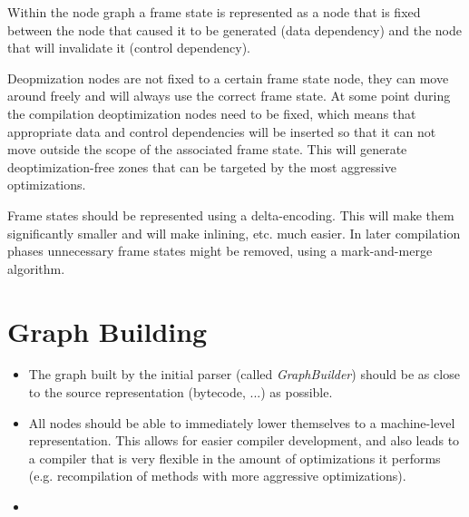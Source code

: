 Within the node graph a frame state is represented as a node that is fixed between the node that caused it to be generated (data dependency) and the node that will invalidate it (control dependency).

Deopmization nodes are not fixed to a certain frame state node, they can move around freely and will always use the correct frame state.
At some point during the compilation deoptimization nodes need to be fixed, which means that appropriate data and control dependencies will be inserted so that it can not move outside the scope of the associated frame state.
This will generate deoptimization-free zones that can be targeted by the most aggressive optimizations.

Frame states should be represented using a delta-encoding.
This will make them significantly smaller and will make inlining, etc. much easier.
In later compilation phases unnecessary frame states might be removed, using a mark-and-merge algorithm.



\section{Graph Building}
\begin{itemize}
    \item The graph built by the initial parser (called \emph{GraphBuilder}) should be as close to the source representation (bytecode, ...) as possible.
    \item All nodes should be able to immediately lower themselves to a machine-level representation. This allows for easier compiler development, and also leads to a compiler that is very flexible in the amount of optimizations it performs (e.g. recompilation of methods with more aggressive optimizations).
    \item 
\end{itemize}
